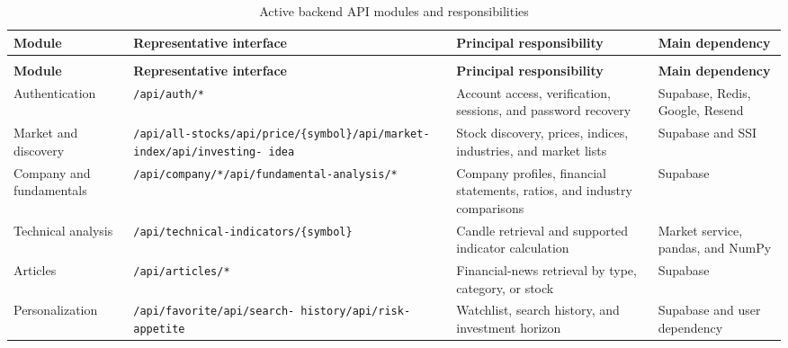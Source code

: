 {\small
\setlength{\tabcolsep}{4pt}
\renewcommand{\arraystretch}{1.22}
\begin{longtable}{>{\raggedright\arraybackslash}p{2.25cm} >{\raggedright\arraybackslash}p{3.35cm} >{\raggedright\arraybackslash}p{5.05cm} >{\raggedright\arraybackslash}p{2.45cm}}
    \caption{Active backend API modules and responsibilities}
    \label{tab:backend-domain-modules} \\
    \toprule
    \textbf{Module} & \textbf{Representative interface} & \textbf{Principal responsibility} & \textbf{Main dependency} \\
    \midrule
    \endfirsthead
    \multicolumn{4}{l}{\small\itshape Table~\ref{tab:backend-domain-modules} continued} \\
    \toprule
    \textbf{Module} & \textbf{Representative interface} & \textbf{Principal responsibility} & \textbf{Main dependency} \\
    \midrule
    \endhead
    \bottomrule
    \endfoot
    Authentication & \texttt{/api/auth/*} & Account access, verification, sessions, and password recovery & Supabase, Redis, Google, Resend \\
    Market and discovery & \texttt{/api/all-stocks}\newline \texttt{/api/price/}\newline \texttt{\{symbol\}}\newline \texttt{/api/market-index}\newline \texttt{/api/investing- idea} & Stock discovery, prices, indices, industries, and market lists & Supabase and SSI \\
    Company and fundamentals & \texttt{/api/company/*}\newline \texttt{/api/fundamental-}\newline \texttt{analysis/*} & Company profiles, financial statements, ratios, and industry comparisons & Supabase \\
    Technical analysis & \texttt{/api/technical-}\newline \texttt{indicators/}\newline \texttt{\{symbol\}} & Candle retrieval and supported indicator calculation & Market service, pandas, and NumPy \\
    Articles & \texttt{/api/articles/*} & Financial-news retrieval by type, category, or stock & Supabase \\
    Personalization & \texttt{/api/favorite}\newline \texttt{/api/search- history}\newline \texttt{/api/risk- appetite} & Watchlist, search history, and investment horizon & Supabase and user dependency \\

\end{longtable}}
